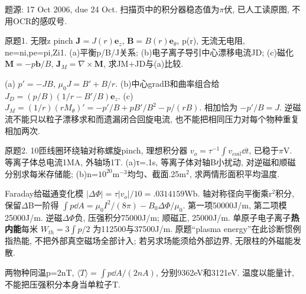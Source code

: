 题源: 17 Oct 2006, due 24 Oct. 扫描页中的积分器稳态值为\ensuremath{\pi}伏, 已人工读原图, 不用OCR的感叹号.
\begin{exercise}\label{ex:06-5-1}
原题1. 无限z pinch $\mathbf J=J(r)\mathbf e_z$, $\mathbf B=B(r)\mathbf e_\theta$, p(r), 无流无电阻, ne=ni,pe=pi,Zi1. (a)平衡p/B/J关系; (b)电子离子导引中心漂移电流JD; (c)磁化 $\mathbf M=-p\mathbf b/B$, $\mathbf J_M=\nabla\times\mathbf M$, 求JM+JD与(a)比较.
\end{exercise}
\begin{solution}
(a) $p'=-JB$, $\mu_0J=B'+B/r$. (b)中心gradB和曲率组合给 $J_D=(p/B)(1/r-B'/B)\mathbf e_z$. (c) $J_M=(1/r)(rM_\theta)'=-p'/B+pB'/B^2-p/(rB)$. 相加恰为 $-p'/B=J$. 逆磁流不能只以粒子漂移求和而遗漏闭合回旋电流, 也不能把相同压力对每个物种重复相加两次.
\end{solution}
\begin{exercise}\label{ex:06-5-2}
原题2. 10匝线圈环绕轴对称螺旋pinch, 理想积分器 $v_o=\tau^{-1}\int v_{coil}\dd t$, 已稳于\ensuremath{\pi}V. 等离子体总电流1MA, 外轴场1T. (a)τ=.1s, 等离子体对轴B小扰动, 对逆磁和顺磁分别求每米存储能; (b)n=$10^{20}$m$^{-3}$均匀、截面.25m\ensuremath{{}^{2}}, 求两情形面积平均温度.
\end{exercise}
\begin{solution}
Faraday给磁通变化模 $|\Delta\Phi|=\tau|v_o|/10=.0314159$Wb. 轴对称径向平衡乘r\ensuremath{{}^{2}}积分, 保留\ensuremath{\Delta}B一阶得 $\int p\dd A=\mu_0I^2/(8\pi)-B_0\Delta\Phi/\mu_0$. 第一项50000J/m, 第二项模25000J/m. 逆磁\ensuremath{\Delta}\ensuremath{\Phi}负, 压强积分75000J/m; 顺磁正, 25000J/m. 单原子电子离子\textbf{热内能}每米 $W_{th}=3\int p/2$ 为112500与37500J/m. 原题``plasma energy''在此诊断惯例指热能, 不把外部真空磁场全部计入; 若另求场能须给外部边界, 无限柱的外磁能发散.

两物种同温p=2nT, $\langle T\rangle=\int p\dd A/(2nA)$, 分别9362eV和3121eV. 温度以能量计, 不能把压强积分本身当单粒子T.
\end{solution}
